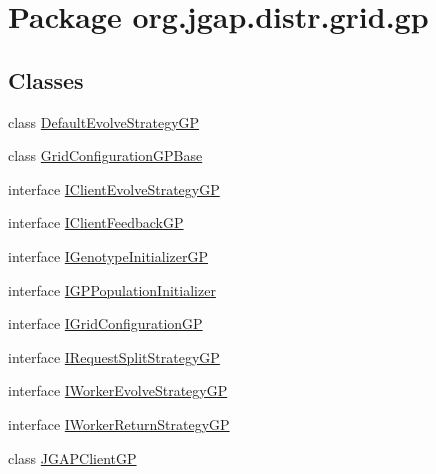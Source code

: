 \hypertarget{namespaceorg_1_1jgap_1_1distr_1_1grid_1_1gp}{\section{Package org.\-jgap.\-distr.\-grid.\-gp}
\label{namespaceorg_1_1jgap_1_1distr_1_1grid_1_1gp}
}
\subsection*{Classes}
\begin{DoxyCompactItemize}
\item 
class \hyperlink{classorg_1_1jgap_1_1distr_1_1grid_1_1gp_1_1_default_evolve_strategy_g_p}{Default\-Evolve\-Strategy\-G\-P}
\item 
class \hyperlink{classorg_1_1jgap_1_1distr_1_1grid_1_1gp_1_1_grid_configuration_g_p_base}{Grid\-Configuration\-G\-P\-Base}
\item 
interface \hyperlink{interfaceorg_1_1jgap_1_1distr_1_1grid_1_1gp_1_1_i_client_evolve_strategy_g_p}{I\-Client\-Evolve\-Strategy\-G\-P}
\item 
interface \hyperlink{interfaceorg_1_1jgap_1_1distr_1_1grid_1_1gp_1_1_i_client_feedback_g_p}{I\-Client\-Feedback\-G\-P}
\item 
interface \hyperlink{interfaceorg_1_1jgap_1_1distr_1_1grid_1_1gp_1_1_i_genotype_initializer_g_p}{I\-Genotype\-Initializer\-G\-P}
\item 
interface \hyperlink{interfaceorg_1_1jgap_1_1distr_1_1grid_1_1gp_1_1_i_g_p_population_initializer}{I\-G\-P\-Population\-Initializer}
\item 
interface \hyperlink{interfaceorg_1_1jgap_1_1distr_1_1grid_1_1gp_1_1_i_grid_configuration_g_p}{I\-Grid\-Configuration\-G\-P}
\item 
interface \hyperlink{interfaceorg_1_1jgap_1_1distr_1_1grid_1_1gp_1_1_i_request_split_strategy_g_p}{I\-Request\-Split\-Strategy\-G\-P}
\item 
interface \hyperlink{interfaceorg_1_1jgap_1_1distr_1_1grid_1_1gp_1_1_i_worker_evolve_strategy_g_p}{I\-Worker\-Evolve\-Strategy\-G\-P}
\item 
interface \hyperlink{interfaceorg_1_1jgap_1_1distr_1_1grid_1_1gp_1_1_i_worker_return_strategy_g_p}{I\-Worker\-Return\-Strategy\-G\-P}
\item 
class \hyperlink{classorg_1_1jgap_1_1distr_1_1grid_1_1gp_1_1_j_g_a_p_client_g_p}{J\-G\-A\-P\-Client\-G\-P}
\item 

\end{DoxyCompactItemize}
